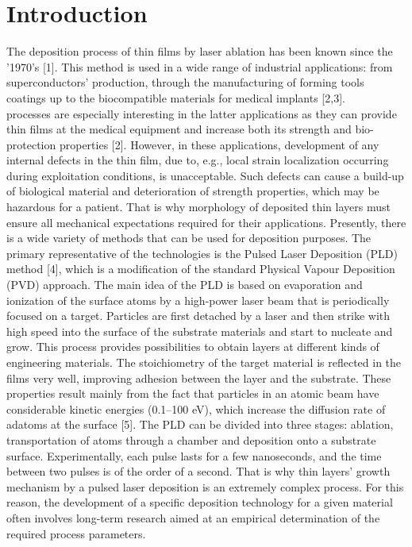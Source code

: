 \documentclass[journal,article,submit,pdftex,moreauthors]{Definitions/mdpi}
\begin{document}
 
\section{Introduction}
 
The deposition process of thin films by laser ablation has been known since the '1970's [1]. This method is used in a wide range of industrial applications: from superconductors' production, through the manufacturing of forming tools coatings up to the biocompatible materials for medical implants [2,3].\\
 processes are especially interesting in the latter applications as they can provide thin films at the medical equipment and increase both its strength and bio-protection properties [2]. However, in these applications, development of any internal defects in the thin film, due to, e.g., local strain localization occurring during exploitation conditions, is unacceptable. Such defects can cause a build-up of biological material and deterioration of strength properties, which may be hazardous for a patient. That is why morphology of deposited thin layers must ensure all mechanical expectations required for their applications. Presently, there is a wide variety of methods that can be used for deposition purposes. The primary representative of the technologies is the Pulsed Laser Deposition (PLD) method [4], which is a modification of the standard Physical Vapour Deposition (PVD) approach. The main idea of the PLD is based on evaporation and ionization of the surface atoms by a high-power laser beam that is periodically focused on a target. Particles are first detached by a laser and then strike with high speed into the surface of the substrate materials and start to nucleate and grow. This process provides possibilities to obtain layers at different kinds of engineering materials. The stoichiometry of the target material is reflected in the films very well, improving adhesion between the layer and the substrate. These properties result mainly from the fact that particles in an atomic beam have considerable kinetic energies (0.1–100 eV), which increase the diffusion rate of adatoms at the surface [5]. The PLD can be divided into three stages: ablation, transportation of atoms through a chamber and deposition onto a substrate surface. Experimentally, each pulse lasts for a few nanoseconds, and the time between two pulses is of the order of a second. That is why thin layers' growth mechanism by a pulsed laser deposition is an extremely complex process. For this reason, the development of a specific deposition technology for a given material often involves long-term research aimed at an empirical determination of the required process parameters.\\ 
\end{document}
